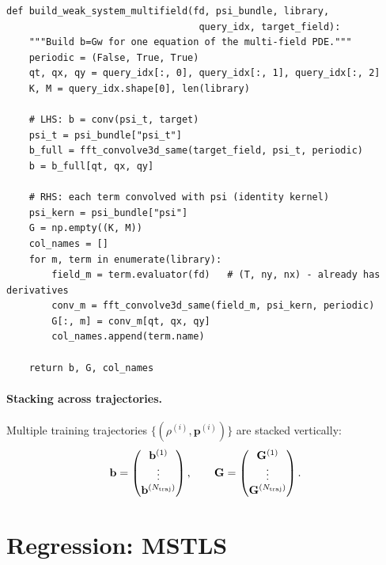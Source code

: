 \documentclass[11pt]{article}
\newcommand{\bp}{\mathbf{p}}
\begin{document}
\begin{lstlisting}[caption={multifield.py --- Multi-field weak system}]
def build_weak_system_multifield(fd, psi_bundle, library,
                                  query_idx, target_field):
    """Build b=Gw for one equation of the multi-field PDE."""
    periodic = (False, True, True)
    qt, qx, qy = query_idx[:, 0], query_idx[:, 1], query_idx[:, 2]
    K, M = query_idx.shape[0], len(library)

    # LHS: b = conv(psi_t, target)
    psi_t = psi_bundle["psi_t"]
    b_full = fft_convolve3d_same(target_field, psi_t, periodic)
    b = b_full[qt, qx, qy]

    # RHS: each term convolved with psi (identity kernel)
    psi_kern = psi_bundle["psi"]
    G = np.empty((K, M))
    col_names = []
    for m, term in enumerate(library):
        field_m = term.evaluator(fd)   # (T, ny, nx) - already has derivatives
        conv_m = fft_convolve3d_same(field_m, psi_kern, periodic)
        G[:, m] = conv_m[qt, qx, qy]
        col_names.append(term.name)

    return b, G, col_names
\end{lstlisting}

\paragraph{Stacking across trajectories.}
Multiple training trajectories $\{(\rho^{(i)}, \bp^{(i)})\}$ are
stacked vertically:
\begin{equation}
  \mathbf{b} = \begin{pmatrix} \mathbf{b}^{(1)} \\ \vdots \\ \mathbf{b}^{(N_{\rm traj})} \end{pmatrix},
  \qquad
  \mathbf{G} = \begin{pmatrix} \mathbf{G}^{(1)} \\ \vdots \\ \mathbf{G}^{(N_{\rm traj})} \end{pmatrix}.
\end{equation}


\section{Regression: MSTLS}
\label{sec:regression}
\end{document}
